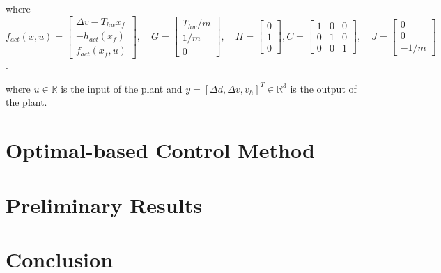 \documentclass{article}
\numberwithin{equation}{section}
\begin{document}
\noindent where 
$f_{a c t}(x,u)=\left[\begin{array}{c}
    \Delta v-T_{h w} x_{f} \\
    -h_{a c t}\left(x_{f}\right) \\
    f_{a c t}\left(x_{f}, u\right)
    \end{array}\right], \quad G=\left[\begin{array}{c}
    T_{h w} / m \\
    1 / m \\
    0
    \end{array}\right], \quad H=\left[\begin{array}{l}
    0 \\
    1 \\
    0
    \end{array}\right],C=\left[\begin{array}{lll}
        1 & 0 & 0 \\
        0 & 1 & 0 \\
        0 & 0 & 1
        \end{array}\right], \quad J=\left[\begin{array}{c}
        0 \\
        0 \\
        -1 / m
    \end{array}\right]$. 

\noindent where $u \in \mathbb{R}$ is the input of the plant and 
$y = [\Delta d, \Delta v, \dot{v_h}]^T \in \mathbb{R}^3$ is the output of the plant.

\section{Optimal-based Control Method}
\section{Preliminary Results}
\section{Conclusion}



\end{document}
